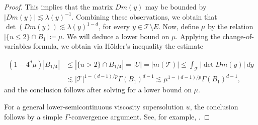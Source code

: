 \documentclass[reqno]{amsart}
\numberwithin{equation}{section}
\numberwithin{equation}{section}
\begin{document}
\begin{proof}
This implies that the matrix $Dm(y)$ may be bounded by $|Dm(y)| \lesssim \lambda(y)^{-1}$. Combining these observations, we obtain that $\det(Dm(y)) \lesssim \lambda(y)^{1-d}$, for every $y\in \mathcal{T}\setminus E$. Now, define $\mu$ by the relation $|\{u \le 2\} \cap B_1| \coloneqq \mu $.  We will deduce a lower bound on $\mu$. Applying the change-of-variables formula, we obtain via H{\"o}lder's inequality the estimate

\begin{align}
(1-4^d\mu)|B_{1/4}| &\le |\{u>2\} \cap B_{1/4}|  = |U| = |m(\mathcal{T})| \le \int_{\mathcal{T}} |\det Dm(y)| \ dy\\
& \lesssim |\mathcal{T}|^{1-(d-1)/p} \Gamma(B_1)^{d-1} \lesssim \mu^{1-(d-1)/p} \Gamma(B_1)^{d-1},
\end{align} 
and the conclusion follows after solving for a lower bound on $\mu$. 

For a general lower-semicontinuous viscosity supersolution $u$, the conclusion follows by a simple $\Gamma$-convergence argument. See, for example, \cite{ImbertSilvestre2016}.
\end{proof}
\end{document}
